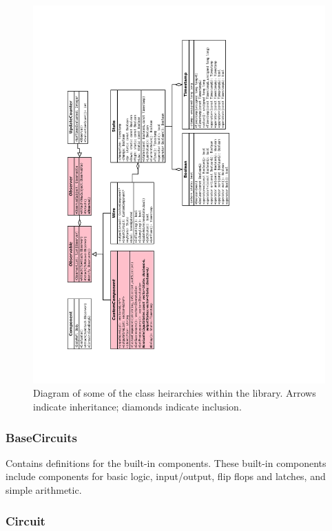 \documentclass{article}
\begin{document}
\begin{figure}
    \begin{center}
        \includegraphics[width=450pt]{imgs/ClassHeirarchies.pdf}
    \end{center}
    \caption{Diagram of some of the class heirarchies within the library. Arrows indicate inheritance; diamonds indicate inclusion.}
\end{figure}

\subsubsection{BaseCircuits}

Contains definitions for the built-in components. These built-in components include components for basic logic, input/output, flip flops and latches, and simple arithmetic.

\subsubsection{Circuit}
\end{document}
